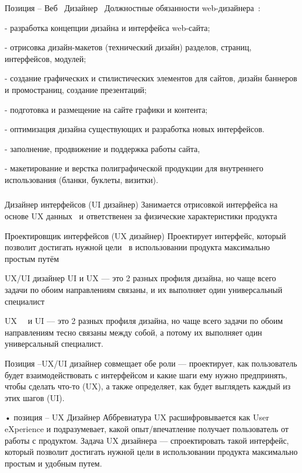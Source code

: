 \documentclass{../industrial-development}
\begin{document}
\lecturenotes

Позиция – Веб~\cite{hh} Дизайнер~\cite{itcf}
Должностные обязанности web-дизайнера~\cite{rab}:

- разработка концепции дизайна и интерфейса web-сайта;

- отрисовка дизайн-макетов (технический дизайн) разделов, страниц, интерфейсов, модулей;

- создание графических и стилистических элементов для сайтов, дизайн баннеров и промостраниц, создание презентаций;

- подготовка и размещение на сайте графики и контента;

- оптимизация дизайна существующих и разработка новых интерфейсов.

- заполнение, продвижение и поддержка работы сайта,

- макетирование и верстка полиграфической продукции для внутреннего использования (бланки, буклеты, визитки).

\begin{frame} \frametitle{}
 \begin{block}{ Дизайнер интерфейсов (UI дизайнер)}
Занимается  отрисовкой интерфейса на основе UX данных ~и ответственен за  физические характеристики продукта
  \end{block}
 \begin{block}{Проектировщик интерфейсов (UX дизайнер) }
Проектирует интерфейс, который позволит достигать нужной цели ~в использовании продукта максимально простым путём
  \end{block}
   \begin{block}{UX/UI дизайнер}
 UI и UX  --- это 2 разных профиля дизайна, но чаще всего задачи по обоим направлениям связаны, и их выполняет один универсальный специалист
  \end{block}
\end{frame}

\lecturenotes

UX~\cite{hh}~\cite{itcf}  и UI — это 2 разных профиля дизайна, но чаще всего задачи по обоим направлениям тесно связаны между собой, а потому их выполняет один универсальный специалист.

Позиция –UX/UI дизайнер совмещает обе роли — проектирует, как пользователь будет взаимодействовать с интерфейсом и какие шаги ему нужно предпринять, чтобы сделать что-то (UX), а также определяет, как будет выглядеть каждый из этих шагов (UI).

•	позиция – UX Дизайнер
Аббревиатура UX расшифровывается как User eXperience и подразумевает, какой опыт/впечатление получает пользователь от работы с продуктом. Задача UX дизайнера — спроектировать такой интерфейс, который позволит достигать нужной цели в использовании продукта максимально простым и удобным путем.
\end{document}
